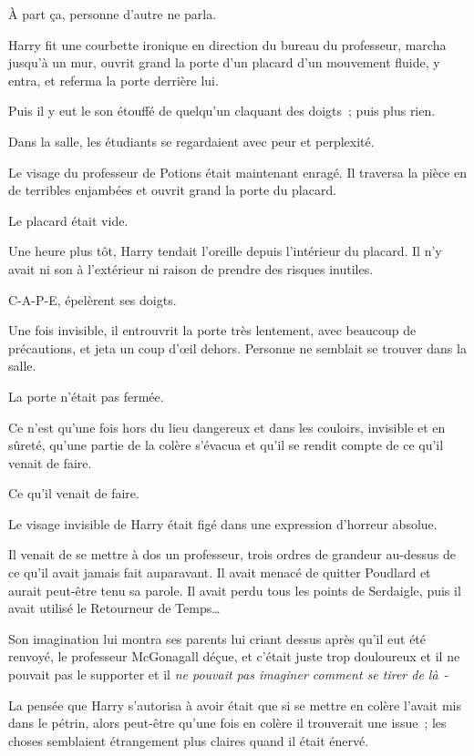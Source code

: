 À part ça, personne d'autre ne parla.

Harry fit une courbette ironique en direction du bureau du professeur, marcha jusqu'à un mur, ouvrit grand la porte d'un placard d'un mouvement fluide, y entra, et referma la porte derrière lui.

Puis il y eut le son étouffé de quelqu'un claquant des doigts~; puis plus rien.

Dans la salle, les étudiants se regardaient avec peur et perplexité.

Le visage du professeur de Potions était maintenant enragé. Il traversa la pièce en de terribles enjambées et ouvrit grand la porte du placard.

Le placard était vide.

\later

Une heure plus tôt, Harry tendait l'oreille depuis l'intérieur du placard. Il n'y avait ni son à l'extérieur ni raison de prendre des risques inutiles.

C-A-P-E, épelèrent ses doigts.

Une fois invisible, il entrouvrit la porte très lentement, avec beaucoup de précautions, et jeta un coup d'œil dehors. Personne ne semblait se trouver dans la salle.

La porte n'était pas fermée.

Ce n'est qu'une fois hors du lieu dangereux et dans les couloirs, invisible et en sûreté, qu'une partie de la colère s'évacua et qu'il se rendit compte de ce qu'il venait de faire.

Ce qu'il venait de faire.

Le visage invisible de Harry était figé dans une expression d'horreur absolue.

Il venait de se mettre à dos un professeur, trois ordres de grandeur au-dessus de ce qu'il avait jamais fait auparavant. Il avait menacé de quitter Poudlard et aurait peut-être tenu sa parole. Il avait perdu tous les points de Serdaigle, puis il avait utilisé le Retourneur de Temps…

Son imagination lui montra ses parents lui criant dessus après qu'il eut été renvoyé, le professeur McGonagall déçue, et c'était juste trop douloureux et il ne pouvait pas le supporter et il \emph{ne pouvait pas imaginer comment se tirer de là}~-

La pensée que Harry s'autorisa à avoir était que si se mettre en colère l'avait mis dans le pétrin, alors peut-être qu'une fois en colère il trouverait une issue~; les choses semblaient étrangement plus claires quand il était énervé.

